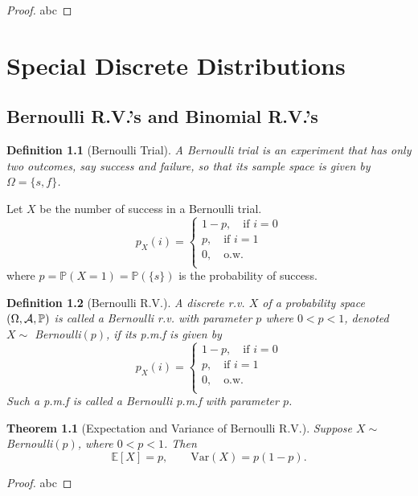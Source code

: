 \documentclass[openany,12pt]{book}
\newtheorem{theorem}{Theorem}[chapter]
\newtheorem{definition}{Definition}[chapter]
\begin{document}
\begin{proof}
  abc
\end{proof}

\chapter{Special Discrete Distributions}
\section{Bernoulli R.V.'s and Binomial R.V.'s}

\begin{definition}[Bernoulli Trial]
A Bernoulli trial is an experiment that has only two outcomes, say success and failure, so that its sample space is given by $\Omega=\{s,f\}$.
\end{definition}

Let $X$ be the number of success in a Bernoulli trial.
$$
p_X (i)=
\begin{cases}
1-p,\quad\text{if } i=0\\
p,\quad\text{if }i=1\\
0,\quad\text{o.w.}\\
\end{cases}
$$
where $p=\mathbb{P}(X=1)=\mathbb{P}(\{s\})$ is the probability of success.

\begin{definition}[Bernoulli R.V.]
A discrete r.v. $X$ of a probability space $(\Omega,\mathcal{A},\mathbb{P})$ is called a Bernoulli r.v. with parameter $p$ where $0<p<1$, denoted $X\sim$ Bernoulli$(p)$, if its p.m.f is given by
$$
p_X (i)=
\begin{cases}
1-p,\quad\text{if } i=0\\
p,\quad\text{if }i=1\\
0,\quad\text{o.w.}\\
\end{cases}
$$
Such a p.m.f is called a Bernoulli p.m.f with parameter $p$.
\end{definition}

\begin{theorem}[Expectation and Variance of Bernoulli R.V.]
Suppose $X\sim$ Bernoulli$(p)$, where $0<p<1$. Then $$\mathbb{E}[X]=p,\qquad \mathrm{Var}(X)=p(1-p).$$
\vspace{0.01cm}
\end{theorem}

\begin{proof}
  abc
\end{proof}
\end{document}
